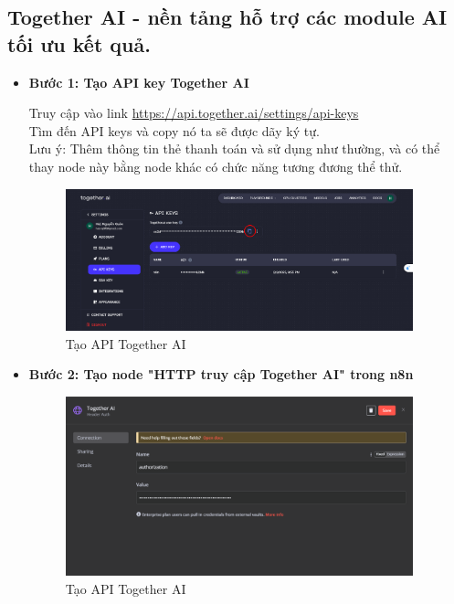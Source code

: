 \subsection{Together AI - nền tảng hỗ trợ các module AI tối ưu kết quả.}
\begin{itemize}[label=]
    \item \textbf{Bước 1: Tạo API key Together AI} 
    
    Truy cập vào link \url{https://api.together.ai/settings/api-keys} \\ 
    Tìm đến API keys và copy nó ta sẽ được dãy ký tự.\\
    Lưu ý: Thêm thông tin thẻ thanh toán và sử dụng như thường, và có thể thay node này bằng node khác có chức năng tương đương thể thử.\\
    
    \begin{figure}[H]
    \centering
    \includegraphics[width=0.95\textwidth]{images/TogetherAI.png}
    \caption{Tạo API Together AI}
    
    \end{figure}
    \item \textbf{Bước 2: Tạo node "HTTP truy cập Together AI" trong n8n}\\
    \begin{figure}[H]
    \centering
    \includegraphics[width=0.95\textwidth]{images/TogetherAI-1.png}
    \caption{Tạo API Together AI}
    

\end{figure}
\end{itemize}
